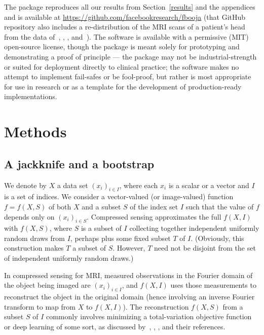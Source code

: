 \documentclass[article]{jdssv}
\begin{document}
The  package  reproduces all our results
from Section~\ref{results} and the appendices and is available at
\url{https://github.com/facebookresearch/fbooja}
(that GitHub repository also includes a re-distribution
of the MRI scans of a patient's head from the data
of~\citet{mri2}, \citet{mri1}, \citet{mri3}, and~\citet{mri4}).
The software is available with a permissive (MIT) open-source license,
though the package is meant solely for prototyping and demonstrating
a proof of principle --- the package may not be industrial-strength
or suited for deployment directly to clinical practice; the software makes
no attempt to implement fail-safes or be fool-proof,
but rather is most appropriate for use in research or as a template
for the development of production-ready implementations.




\section{Methods}
\label{methods}


\subsection{A jackknife and a bootstrap}
We denote by $X$ a data set $(x_i)_{i \in I}$,
where each $x_i$ is a scalar or a vector and $I$ is a set of indices.
We consider a vector-valued (or image-valued) function $f = f(X, S)$
of both $X$ and a subset $S$ of the index set $I$
such that the value of $f$ depends only on $(x_i)_{i \in S}$.
Compressed sensing approximates the full $f(X, I)$ with $f(X, S)$,
where $S$ is a subset of $I$ collecting together independent uniformly random
draws from $I$, perhaps plus some fixed subset $T$ of $I$.
(Obviously, this construction makes $T$ a subset of $S$. However,
$T$ need not be disjoint from the set of independent uniformly random draws.)

In compressed sensing for MRI, measured observations in the Fourier domain
of the object being imaged are $(x_i)_{i \in I}$, and $f(X, I)$ uses those
measurements to reconstruct the object in the original domain
(hence involving an inverse Fourier transform to map from $X$ to $f(X, I)$).
The reconstruction $f(X, S)$ from a subset $S$ of $I$ commonly involves
minimizing a total-variation objective function or deep learning of some sort,
as discussed by~\citet{tao-yang}, \citet{yang-zhang},
\citet{hammernik-klatzer-kobler-recht-sodickson-pock-knoll},
and their references.
\end{document}
